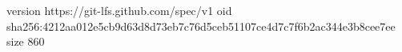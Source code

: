 version https://git-lfs.github.com/spec/v1
oid sha256:4212aa012e5cb9d63d8d73eb7c76d5ceb51107ce4d7c7f6b2ac344e3b8cee7ee
size 860
